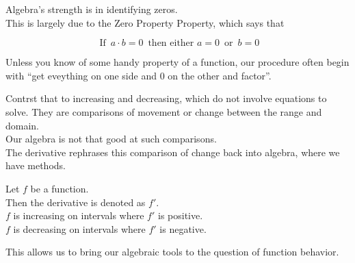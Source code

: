 \documentclass{ximera}
\begin{document}
Algebra's strength is in identifying zeros. \\


This is largely due to the Zero Property Property, which says that 



\[
\text{ If } \, a \cdot b = 0 \, \text{ then either } a = 0 \, \text{ or } \, b = 0
\]


Unless you know of some handy property of a function, our procedure often begin with ``get eveything on one side and $0$ on the other and factor''.




Contrst that to increasing and decreasing, which do not involve equations to solve.  They are comparisons of movement or change between the range and domain. \\

Our algebra is not that good at such comparisons. \\


The derivative rephrases this comparison of change back into algebra, where we have methods. \\





\begin{template}

Let $f$ be a function. \\

Then the derivative is denoted as $f'$. \\


$f$ is increasing on intervals where $f'$ is positive. \\


$f$ is decreasing on intervals where $f'$ is negative. \\


\end{template}

This allows us to bring our algebraic tools to the question of function behavior. \\
\end{document}
